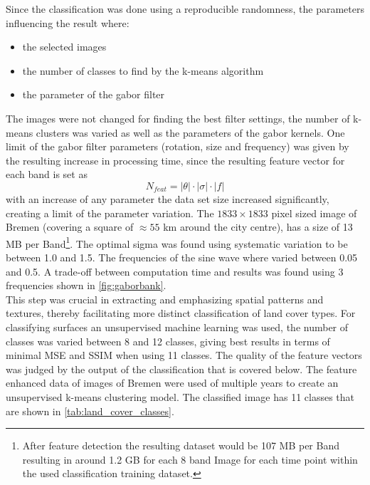 \documentclass[12pt,a4paper, english,twoside]{scrartcl}
\begin{document}
      Since the classification was done using a reproducible randomness, the parameters influencing the result where:
      \begin{itemize}
        \item the selected images
        \item the number of classes to find by the k-means algorithm
        \item the parameter of the gabor filter
      \end{itemize}
      The images were not changed for finding the best filter settings, the number of k-means clusters was varied as well as the parameters of the gabor kernels. 
      One limit of the gabor filter parameters (rotation, size and frequency) was given by the resulting increase in processing time, since the resulting feature vector for each band is set as      %
      \begin{equation}
        N_{feat} = |\theta| \cdot |\sigma| \cdot |f| 
      \end{equation}
      with an increase of any parameter the data set size increased significantly, creating a limit of the parameter variation. 
    The $1833 \times 1833$ pixel sized image of Bremen (covering a square of $\approx 55$ km around the city centre), has a size of 13 MB per Band\footnote{%
    After feature detection the resulting dataset would be 107 MB per Band resulting in around 1.2 GB for each 8 band Image for each time point within the used classification training dataset.}.
    The optimal sigma was found using systematic variation to be between 1.0 and 1.5. 
    The frequencies of the sine wave where varied between 0.05 and 0.5. 
    A trade-off between computation time and results was found using 3 frequencies shown in \cref{fig:gaborbank}. \\ 
    This step was crucial in extracting and emphasizing spatial patterns and textures, thereby facilitating more distinct classification of land cover types.
      For classifying surfaces an unsupervised machine learning was used, the number of classes was varied between 8 and 12 classes, giving best results in terms of minimal \gls{MSE} and \gls{SSIM} when using 11 classes.
      The quality of the feature vectors was judged by the output of the classification that is covered below. 
      The feature enhanced data of images of Bremen%
      were used of multiple years to create an unsupervised k-means clustering model.
      The classified image has 11 classes that are shown in \cref{tab:land_cover_classes}.
\end{document}
